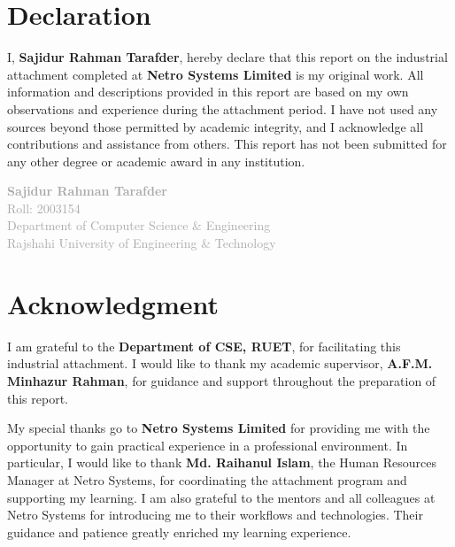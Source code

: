 \documentclass[12pt,a4paper]{report}
\begin{document}
\chapter*{\textcolor{primaryblue}{Declaration}}

I, \textcolor{skillcolor}{\textbf{Sajidur Rahman Tarafder}}, hereby declare that this report on the industrial attachment completed at \textcolor{companycolor}{\textbf{Netro Systems Limited}} is my original work. All information and descriptions provided in this report are based on my own observations and experience during the attachment period. I have not used any sources beyond those permitted by academic integrity, and I acknowledge all contributions and assistance from others. This report has not been submitted for any other degree or academic award in any institution.

\vspace{1cm}

\noindent
\textcolor{darkgray}{\textbf{Sajidur Rahman Tarafder}}\\
\textcolor{darkgray}{Roll: 2003154}\\
\textcolor{darkgray}{Department of Computer Science \& Engineering}\\
\textcolor{darkgray}{Rajshahi University of Engineering \& Technology}

\chapter*{\textcolor{primaryblue}{Acknowledgment}}

I am grateful to the \textcolor{companycolor}{\textbf{Department of CSE, RUET}}, for facilitating this industrial attachment. I would like to thank my academic supervisor, \textcolor{skillcolor}{\textbf{A.F.M. Minhazur Rahman}}, for guidance and support throughout the preparation of this report.

My special thanks go to \textcolor{companycolor}{\textbf{Netro Systems Limited}} for providing me with the opportunity to gain practical experience in a professional environment. In particular, I would like to thank \textcolor{skillcolor}{\textbf{Md. Raihanul Islam}}, the Human Resources Manager at Netro Systems, for coordinating the attachment program and supporting my learning. I am also grateful to the mentors and all colleagues at Netro Systems for introducing me to their workflows and technologies. Their guidance and patience greatly enriched my learning experience.
\end{document}
